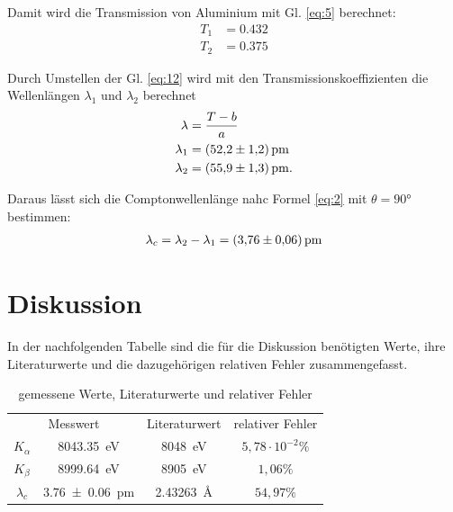 Damit wird die Transmission von Aluminium mit Gl. \eqref{eq:5} berechnet:
\begin{subequations}
\begin{align}
    T_1 &= 0.432 \label{16a}\\
    T_2 &= 0.375 \label{16b} 
\end{align}
\end{subequations}

Durch Umstellen der Gl. \eqref{eq:12} wird mit den Transmissionskoeffizienten
die Wellenlängen $\lambda _1$ und $\lambda _2$ berechnet
\begin{subequations}
\begin{align}
    \lambda &= \frac{T-b}{a} \label{17a}\\
    \lambda _1 &= \SI{52.2+-1.2}{\pico\meter} \label{17b}\\
    \lambda _2 &= \SI{55.9+-1.3}{\pico\meter} \label{17c}.
\end{align}
\end{subequations}

Daraus lässt sich die Comptonwellenlänge nahc Formel \eqref{eq:2} mit $\theta = 90°$
bestimmen:
\begin{align}
    \lambda _c = \lambda _2 - \lambda _1 = \SI{3.76+-0.06}{\pico\meter} \label{eq:18}
\end{align}



\section{Diskussion}

In der nachfolgenden Tabelle sind die für die Diskussion benötigten Werte, ihre Literaturwerte und
die dazugehörigen relativen Fehler zusammengefasst.
\begin{table}[H]
\centering
\begin{tabular}{c c c c}
\toprule
\multicolumn{2}{c}{Messwert}& \multicolumn{1}{c}{Literaturwert}& \multicolumn{1}{c}{relativer Fehler} \\
\cmidrule(lr){1-2}
$K_{\alpha}$    &   \SI{8043.35}{\electronvolt} & \SI{8048}{\electronvolt} \cite{K_Linie} & $5,78\cdot 10^{-2 }\%$\\
$K_{\beta} $    &   \SI{8999.64}{\electronvolt} & \SI{8905}{\electronvolt} \cite{K_Linie} & $1,06\%$\\
$\lambda _c$    &   \SI{3.76+-0.06}{\pico\meter} & \SI{2.43263}{\angstrom} \cite{nolting2013grundlagen} & $54,97\%$\\
\bottomrule
\end{tabular}
\caption{gemessene Werte, Literaturwerte und relativer Fehler}
\label{tab:3}
\end{table}

